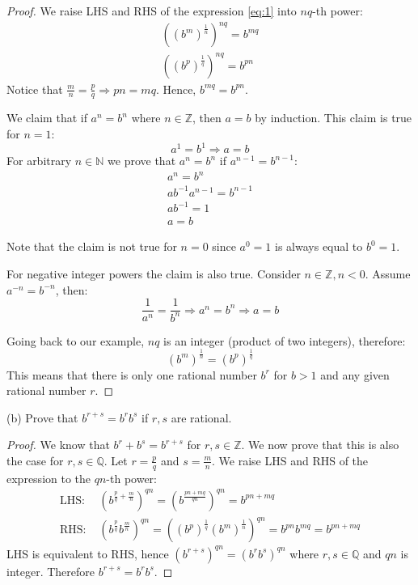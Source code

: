 \documentclass{article}
\newcommand{\Q}{\mathbb{Q}}
\newcommand{\N}{\mathbb{N}}
\newcommand{\Z}{\mathbb{Z}}
\begin{document}
\begin{proof}

We raise LHS and RHS of the expression \ref{eq:1} into $nq$-th power:
\begin{gather*}
    ((b^m)^{\frac{1}{n}})^{nq} = b^{mq} \\
    ((b^p)^{\frac{1}{q}})^{nq} = b^{pn}    
\end{gather*}
Notice that $\frac{m}{n}=\frac{p}{q} \Rightarrow pn = mq$. Hence, $b^{mq} = b^{pn}$.

We claim that if $a^n = b^n$ where $n \in \Z$, then $a=b$ by induction.
This claim is true for $n=1$:
\[ a^1 = b^1 \Rightarrow a = b \]
For arbitrary $n \in \N$ we prove that $a^n = b^n$ if $a^{n-1} = b^{n-1}$:
\begin{gather*}
    a^n = b^n \\
    ab^{-1}a^{n-1} = b^{n-1} \\
    ab^{-1} = 1 \\
    a = b
\end{gather*}

Note that the claim is not true for $n=0$ since $a^0=1$ is always equal to $b^0=1$.

For negative integer powers the claim is also true.
Consider $n \in \Z, n<0$. Assume $a^{-n} = b^{-n}$, then:
\[ \frac{1}{a^n} = \frac{1}{b^n} \Rightarrow a^n = b^n \Rightarrow a=b \]

Going back to our example, $nq$ is an integer (product of two integers), therefore:
\[ (b^m)^{\frac{1}{n}} = (b^p)^{\frac{1}{q}} \]
This means that there is only one rational number $b^r$ for $b>1$ and any given rational number $r$.

\end{proof}

\begin{tcolorbox}
(b) Prove that $b^{r+s} = b^r b^s$ if $r, s$ are rational.
\end{tcolorbox}

\begin{proof}

We know that $b^r+b^s = b^{r+s}$ for $r,s \in \Z$.
We now prove that this is also the case for $r,s \in \Q$.
Let $r=\frac{p}{q}$ and $s=\frac{m}{n}$.
We raise LHS and RHS of the expression to the $qn$-th power:
\begin{align*}
    \text{LHS: } & (b^{\frac{p}{q}+\frac{m}{n}})^{qn} = (b^{\frac{pn+mq}{qn}})^{qn} = b^{pn+mq} \\
    \text{RHS: } & (b^{\frac{p}{q}}b^{\frac{m}{n}})^{qn}= ((b^p)^\frac{1}{q}(b^m)^\frac{1}{n})^{qn} = b^{pn} b^{mq} = b^{pn+mq}
\end{align*}
LHS is equivalent to RHS, hence $(b^{r+s})^{qn} = (b^r b^s)^{qn} $ where $r, s \in \Q$ and $qn$ is integer.
Therefore $b^{r+s} = b^r b^s$. 

\end{proof}
\end{document}
